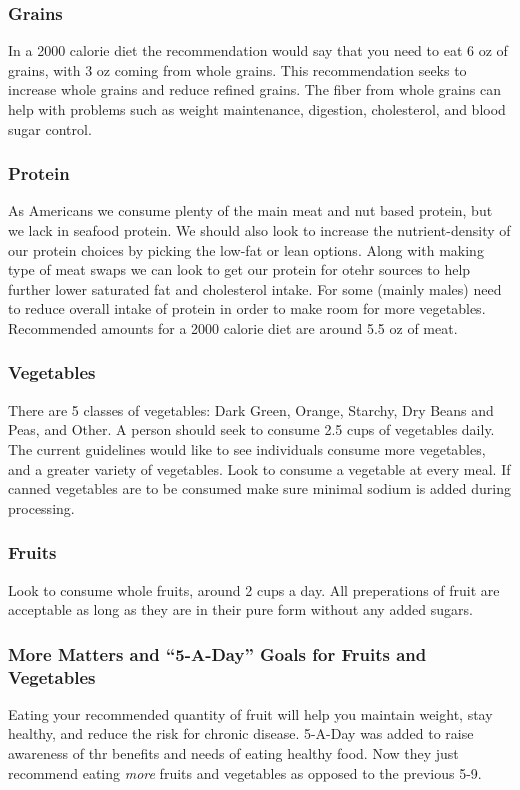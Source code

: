 \documentclass[letterpaper, 11pt]{article}
\begin{document}
\subsubsection{Grains}
\label{sec:orgce4bc5c}
In a 2000 calorie diet the recommendation would say that you need to eat 6 oz of grains, with 3 oz coming from whole grains. This recommendation seeks to increase whole grains and reduce refined grains. The fiber from whole grains can help with problems such as weight maintenance, digestion, cholesterol, and blood sugar control.\\
\subsubsection{Protein}
\label{sec:orge9e7f6d}
As Americans we consume plenty of the main meat and nut based protein, but we lack in seafood protein. We should also look to increase the nutrient-density of our protein choices by picking the low-fat or lean options. Along with making type of meat swaps we can look to get our protein for otehr sources to help further lower saturated fat and cholesterol intake. For some (mainly males) need to reduce overall intake of protein in order to make room for more vegetables. Recommended amounts for a 2000 calorie diet are around 5.5 oz of meat.\\
\subsubsection{Vegetables}
\label{sec:orgb0a4aea}
There are 5 classes of vegetables: Dark Green, Orange, Starchy, Dry Beans and Peas, and Other. A person should seek to consume 2.5 cups of vegetables daily. The current guidelines would like to see individuals consume more vegetables, and a greater variety of vegetables. Look to consume a vegetable at every meal. If canned vegetables are to be consumed make sure minimal sodium is added during processing.\\
\subsubsection{Fruits}
\label{sec:orged140f3}
Look to consume whole fruits, around 2 cups a day. All preperations of fruit are acceptable as long as they are in their pure form without any added sugars.\\
\subsubsection{More Matters and ``5-A-Day'' Goals for Fruits and Vegetables}
\label{sec:orgda4fa78}
Eating your recommended quantity of fruit will help you maintain weight, stay healthy, and reduce the risk for chronic disease. 5-A-Day was added to raise awareness of thr benefits and needs of eating healthy food. Now they just recommend eating \emph{more} fruits and vegetables as opposed to the previous 5-9.\\
\end{document}
